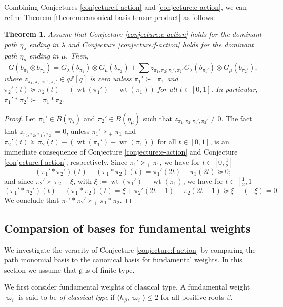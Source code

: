 \documentclass[final]{amsart}
\theoremstyle{plain}
\newtheorem{theorem}[corollary]{Theorem}
\theoremstyle{definition}
\newcommand{\bbZ}{\mathbb Z}
\newcommand{\frakg}{\mathfrak g}
\DeclareMathOperator{\weight}{wt}
\begin{document}
Combining Conjectures \ref{conjecture:f-action} and \ref{conjecture:e-action}, we can refine Theorem \ref{theorem:canonical-basis-tensor-product} as follows:
\begin{theorem}
    \label{theorem:canonical-basis-tensor-product-refined}
    Assume that Conjecture \ref{conjecture:e-action} holds for the dominant path $\eta_\lambda$ ending in $\lambda$ and Conjecture \ref{conjecture:f-action} holds for the dominant path $\eta_\mu$ ending in $\mu$.
    Then,
    \[
        G(b_{\pi_1} \otimes b_{\pi_2}) = G_\lambda(b_{\pi_1}) \otimes G_\mu(b_{\pi_2}) + \sum z_{\pi_1, \pi_2;\pi_1', \pi_2'} G_\lambda(b_{\pi_1'}) \otimes G_\mu(b_{\pi_2'}),
    \]
    where $z_{\pi_1, \pi_2;\pi_1', \pi_2'} \in q\bbZ[q]$ is zero unless $\pi_1' \succ_+ \pi_1$ and $\pi_2'(t) \succeq \pi_2(t) - (\weight(\pi_1') - \weight(\pi_1))$ for all $t \in [0, 1]$.
    In particular, $\pi_1'*\pi_2' \succ_+ \pi_1*\pi_2$.
\end{theorem}
\begin{proof}
    Let $\pi_1' \in B(\eta_\lambda)$ and $\pi_2' \in B(\eta_\mu)$ such that $z_{\pi_1, \pi_2;\pi_1', \pi_2'} \neq 0$.
    The fact that $z_{\pi_1, \pi_2;\pi_1', \pi_2'} = 0$, unless $\pi_1' \succ_+ \pi_1$ and $\pi_2'(t) \succeq \pi_2(t) - (\weight(\pi_1') - \weight(\pi_1))$ for all $t \in [0, 1]$, is an immediate consequence of Conjecture \ref{conjecture:e-action} and Conjecture \ref{conjecture:f-action}, respectively.
    Since $\pi_1' \succ_+ \pi_1$, we have for $t \in [0, \frac12]$
    \[
        (\pi_1'*\pi_2')(t) - (\pi_1*\pi_2)(t) = \pi_1'(2t) - \pi_1(2t) \succeq 0;
    \]
    and since $\pi_2' \succ \pi_2 - \xi$, with $\xi := \weight(\pi_1') - \weight(\pi_1)$, we have for $t \in [\frac12, 1]$
    \[
        (\pi_1'*\pi_2')(t) - (\pi_1*\pi_2)(t) = \xi + \pi_2'(2t-1) - \pi_2(2t-1) \succeq \xi + (-\xi) = 0.
    \]
    We conclude that $\pi_1' * \pi_2' \succ_+ \pi_1 * \pi_2$.
\end{proof}

\subsection{Comparsion of bases for fundamental weights}
\label{section:canonical-basis-fundamental-weights}

We investigate the veracity of Conjecture \ref{conjecture:f-action} by comparing the path monomial basis to the canonical basis for fundamental weights.
In this section we assume that $\frakg$ is of finite type.

We first consider fundamental weights of classical type.
A fundamental weight $\varpi_i$ is said to be \emph{of classical type} if $\langle h_\beta, \varpi_i\rangle \le 2$ for all positive roots $\beta$.
\end{document}
